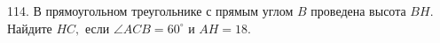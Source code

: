 114. В прямоугольном треугольнике с прямым углом $B$ проведена высота $BH.$ Найдите $HC,$ если $\angle ACB=60^\circ$ и $AH=18.$\\
